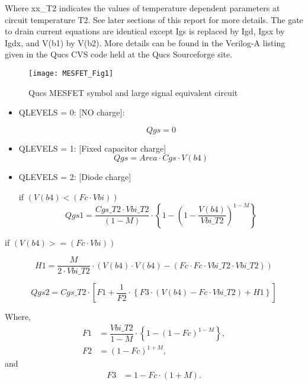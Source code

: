 Where xx\_T2 indicates the values of temperature dependent parameters
at circuit temperature T2.  See later sections of this report for more
details.  The gate to drain current equations are identical except Igs
is replaced by Igd, Igsx by Igdx, and V(b1) by V(b2). More details can
be found in the Verilog-A listing given in the Qucs CVS code held at
the Qucs Sourceforge site.
\begin{figure} 
  \centering
  \texttt{[image: MESFET\_Fig1]}
  \caption{Qucs MESFET symbol and large signal equivalent circuit} 
  \label{fig:fig1}
\end{figure}

\begin{itemize}
 \item QLEVELS = 0: [NO charge]:

\begin{equation} Qgs = 0  \end{equation}
 \item QLEVELS = 1: [Fixed capacitor charge] 
\begin{equation} Qgs = Area \cdot Cgs \cdot V(b4) \end{equation}
 \item QLEVELS = 2: [Diode charge]

if $( V(b4) < (Fc \cdot Vbi) )$
\begin{equation} Qgs1 = \dfrac{Cgs\_T2 \cdot Vbi\_T2}{(1-M)} \cdot \left\lbrace 1 - \left( 1-\dfrac{V(b4)}{Vbi\_T2}\right) ^{1-M} \right\rbrace \end{equation}
\end{itemize}


\hspace{10mm} if $( V(b4) >= (Fc \cdot Vbi) )$

\begin{equation}
H1 =\dfrac{M}{2 \cdot Vbi\_T2}  \cdot \left( V(b4) \cdot V(b4) - \left( Fc \cdot Fc \cdot Vbi\_T2 \cdot Vbi\_T2 \right)  \right)
\end{equation}

\begin{equation} 
Qgs2 = Cgs\_T2 \cdot \left[ F1+\dfrac{1}{F2} \cdot \left\lbrace  F3 \cdot \left(  V(b4) - Fc \cdot Vbi\_T2 \right) +  H1  \right\rbrace  \right]
\end{equation}
 
Where,
\begin{align}
F1 &= \dfrac{Vbi\_T2}{1-M} \cdot \left\lbrace 1- \left(1-Fc\right) ^{1-M} \right\rbrace ,\\
F2 &= \left( 1-Fc\right) ^{1+M},
\end{align}
and 
\begin{align}
F3 &= 1-Fc \cdot \left( 1+M\right).
\end{align}

